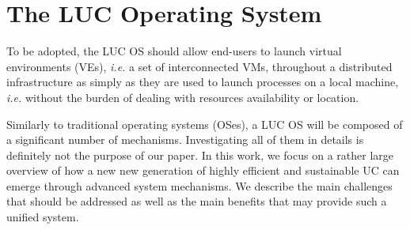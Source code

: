 \section{The LUC Operating System}

To be adopted, the LUC OS should allow end-users to
launch virtual environments (VEs), \textit{i.e.} a set of interconnected VMs,
throughout a  distributed infrastructure as simply as they are used to launch
processes on a local machine, \textit{i.e.}  without the burden of dealing with
resources availability or location. 

Similarly to traditional operating systems (OSes), a LUC OS will be composed of
a significant number of mechanisms.  Investigating all of them in details is
definitely not the purpose of our paper.  In this work, we focus on a rather
large overview of how a new new generation of highly efficient and sustainable
UC  can emerge through advanced system mechanisms.  We describe the main
challenges that should be addressed as well as the main benefits that
may provide such a unified system. 


